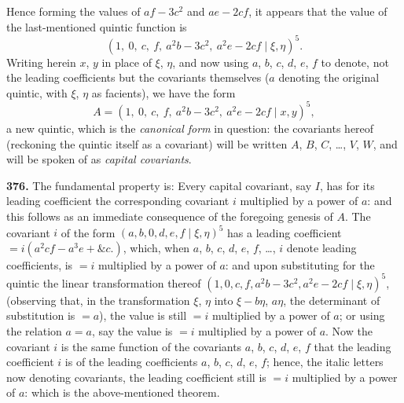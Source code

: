 \documentclass[11pt,a4paper]{book}
\begin{document}
Hence forming the values of $af - 3c^2$ and $ae - 2cf$, it appears that the value of the last-mentioned quintic function is
\[
(1,\ 0,\ c,\ f,\ a^2 b - 3c^2,\ a^2 e - 2cf \mid \xi, \eta)^5.
\]
Writing herein $x$, $y$ in place of $\xi$, $\eta$, and now using $a$, $b$, $c$, $d$, $e$, $f$ to denote, not the leading coefficients but the covariants themselves ($a$ denoting the original quintic, with $\xi$, $\eta$ as facients), we have the form
\[
A = (1,\ 0,\ c,\ f,\ a^2 b - 3c^2,\ a^2 e - 2cf \mid x, y)^5,
\]
a new quintic, which is the \textit{canonical form} in question: the covariants hereof (reckoning the quintic itself as a covariant) will be written $A$, $B$, $C$, \ldots, $V$, $W$, and will be spoken of as \textit{capital covariants}.

\medskip

\noindent\textbf{376.} The fundamental property is: Every capital covariant, say $I$, has for its leading coefficient the corresponding covariant $i$ multiplied by a power of $a$: and this follows as an immediate consequence of the foregoing genesis of $A$. The covariant $i$ of the form $(a, b, 0, d, e, f \mid \xi, \eta)^5$ has a leading coefficient $= i(a^2 cf - a^3 e + \&c.)$, which, when $a$, $b$, $c$, $d$, $e$, $f$, \ldots, $i$ denote leading coefficients, is $= i$ multiplied by a power of $a$: and upon substituting for the quintic the linear transformation thereof $(1, 0, c, f, a^2 b - 3c^2, a^2 e - 2cf \mid \xi, \eta)^5$, (observing that, in the transformation $\xi$, $\eta$ into $\xi - b\eta$, $a\eta$, the determinant of substitution is $= a$), the value is still $= i$ multiplied by a power of $a$; or using the relation $a = a$, say the value is $= i$ multiplied by a power of $a$. Now the covariant $i$ is the same function of the covariants $a$, $b$, $c$, $d$, $e$, $f$ that the leading coefficient $i$ is of the leading coefficients $a$, $b$, $c$, $d$, $e$, $f$; hence, the italic letters now denoting covariants, the leading coefficient still is $= i$ multiplied by a power of $a$: which is the above-mentioned theorem.

\medskip
\end{document}
